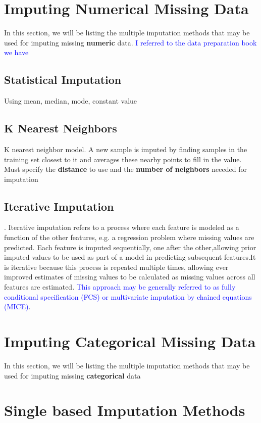 \documentclass{article}
\begin{document}
\section{Imputing Numerical Missing Data}
In this section, we will be listing the multiple imputation methods that may be used for imputing missing \textbf{numeric} data. \textcolor{blue}{I referred to the data preparation book we have}

\subsection{Statistical Imputation}
Using mean, median, mode, constant value

\subsection{K Nearest Neighbors}
K nearest neighbor model. A new sample is imputed by finding samples in the training set closest to it and averages these nearby points to fill in the value. Must specify the \textbf{distance} to use and the \textbf{number of neighbors} neeeded for imputation

\subsection{Iterative Imputation}
.  Iterative imputation refers to a process where each feature is modeled as a function of the other features, e.g.  a regression problem where missing values are predicted.  Each feature is imputed sequentially, one after the other,allowing prior imputed values to be used as part of a model in predicting subsequent features.It is iterative because this process is repeated multiple times, allowing ever improved estimates of missing values to be calculated as missing values across all features are estimated.  \textcolor{blue}{This approach may be generally referred to as fully conditional specification (FCS) or multivariate imputation by chained equations (MICE)}.

\section{Imputing Categorical Missing Data}
In this section, we will be listing the multiple imputation methods that may be used for imputing missing \textbf{categorical} data

\section*{Single based Imputation Methods}
\end{document}
